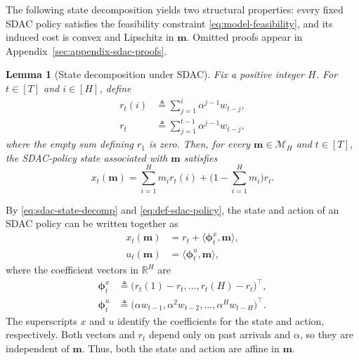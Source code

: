 \documentclass[journal]{IEEEtran}
\newtheorem{lemma}{Lemma}
\theoremstyle{remark}
\begin{document}
The following state decomposition yields two structural properties: every
fixed SDAC policy satisfies the feasibility constraint
\eqref{eq:model-feasibility}, and its induced cost is convex and Lipschitz in
$\mathbf{m}$. Omitted proofs appear in
Appendix~\ref{sec:appendix-sdac-proofs}.

\begin{lemma}[State decomposition under SDAC]
\label{lem:sdac-state-decomp}
Fix a positive integer $H$.
For $t\in[T]$ and $i\in[H]$, define
\begin{equation}
\label{eq:def-arrival-sums}
\begin{aligned}
r_t(i)
&\triangleq
\sum_{j=1}^{i}\alpha^{j-1}w_{t-j},
\\
r_t
&\triangleq
\sum_{j=1}^{t-1}\alpha^{j-1}w_{t-j},
\end{aligned}
\end{equation}
where the empty sum defining $r_1$ is zero. Then, for every
$\mathbf{m}\in\mathcal{M}_H$ and $t\in[T]$, the SDAC-policy state associated
with $\mathbf{m}$ satisfies
\begin{equation}
\label{eq:sdac-state-decomp}
x_t(\mathbf{m})
=
\sum_{i=1}^H m_i r_t(i)
+\bigl(1-\sum_{i=1}^H m_i\bigr)r_t.
\end{equation}
\end{lemma}

By \eqref{eq:sdac-state-decomp} and \eqref{eq:def-sdac-policy}, the state and
action of an SDAC policy can be written together as
\begin{equation}
\label{eq:surr-affine-pair}
\begin{aligned}
x_t(\mathbf{m})&=r_t+\langle\boldsymbol{\phi}_t^x,\mathbf{m}\rangle,\\
u_t(\mathbf{m})&=\langle\boldsymbol{\phi}_t^u,\mathbf{m}\rangle,
\end{aligned}
\end{equation}
where the coefficient vectors in $\mathbb{R}^H$ are
\begin{equation}
\label{eq:def-phi-u}
\begin{aligned}
\boldsymbol{\phi}_t^x
&\triangleq\bigl(r_t(1)-r_t,\ldots,r_t(H)-r_t\bigr)^\top,\\
\boldsymbol{\phi}_t^u
&\triangleq\bigl(\alpha w_{t-1},\alpha^2 w_{t-2},\ldots,\alpha^H w_{t-H}\bigr)^\top.
\end{aligned}
\end{equation}
The superscripts $x$ and $u$ identify the coefficients for the state and action,
respectively. Both vectors and $r_t$ depend only on past arrivals and $\alpha$,
so they are independent of $\mathbf{m}$. Thus, both the state and action are
affine in $\mathbf{m}$.
\end{document}
